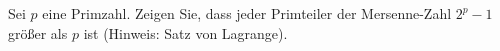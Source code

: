 
\begin{exercise}

Sei $p$ eine Primzahl. Zeigen Sie, dass jeder Primteiler der Mersenne-Zahl $2^p - 1$
größer als $p$ ist (Hinweis: Satz von Lagrange).

\end{exercise}


\begin{solution}

\phantom{}

\end{solution}


